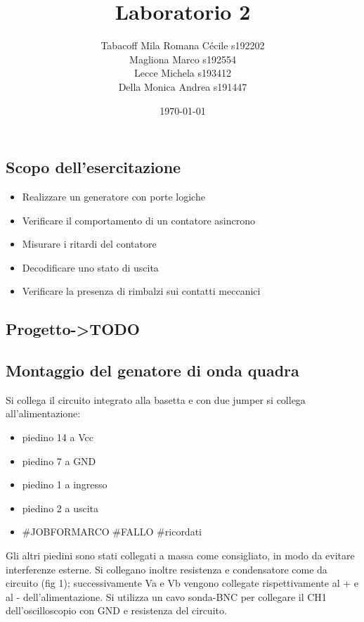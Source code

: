 \documentclass[a4paper]{article}
\begin{document}
\title{Laboratorio 2}
\author{
        Tabacoff Mila Romana Cécile s192202\\
        Magliona Marco s192554 \\
        Lecce Michela s193412\\
        Della Monica Andrea s191447}

\date{\today}
\maketitle

\newpage

\begin{tcolorbox}[breakable,colback=cyan,colframe=cyan]
\section*{Scopo dell'esercitazione}
\end{tcolorbox}

\begin{itemize}
\item Realizzare un generatore con porte logiche
\item Verificare il comportamento di un contatore asincrono
\item Misurare i ritardi del contatore
\item Decodificare uno stato di uscita
\item Verificare la presenza di rimbalzi sui contatti meccanici
\end{itemize}

\begin{tcolorbox}[breakable,colback=cyan,colframe=cyan]
\section*{Progetto->TODO}
\end{tcolorbox}


\begin{tcolorbox}[breakable,colback=cyan,colframe=cyan]
\section*{Montaggio del genatore di onda quadra}
\end{tcolorbox}

Si collega il circuito integrato alla basetta e con due jumper si collega all'alimentazione:
\begin{itemize}
\item piedino 14 a Vcc
\item piedino 7 a GND
\item piedino 1 a ingresso
\item piedino 2 a uscita
\item #JOBFORMARCO #FALLO #ricordati
\end{itemize}
Gli altri piedini sono stati collegati a massa come consigliato, in modo da evitare interferenze esterne.
Si collegano inoltre resistenza e condensatore come da circuito (fig 1); successivamente Va e Vb vengono collegate rispettivamente al + e al - dell'alimentazione.
Si utilizza un cavo sonda-BNC per collegare il CH1 dell'oscilloscopio con GND e resistenza del circuito.
\end{document}
